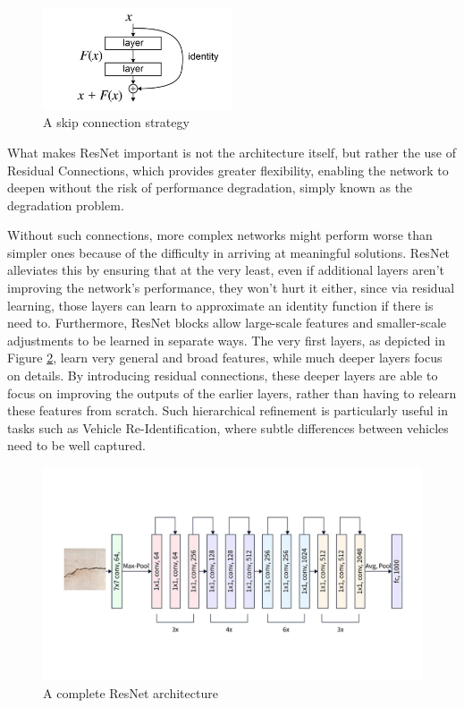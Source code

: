 \begin{figure}[ht]
    \centering
    \includegraphics[width=0.5\textwidth]{images/SkipConnection.jpg}
    \caption[A skip-connection strategy]{A skip connection strategy}
    \label{fig:SkipConnection}
\end{figure}

What makes ResNet important is not the architecture itself, but rather the use of Residual Connections, which provides greater flexibility, enabling the network to deepen without the risk of performance degradation, simply known as the degradation problem.

Without such connections, more complex networks might perform worse than simpler ones because of the difficulty in arriving at meaningful solutions. ResNet alleviates this by ensuring that at the very least, even if additional layers aren't improving the network's performance, they won't hurt it either, since via residual learning, those layers can learn to approximate an identity function if there is need to. Furthermore, ResNet blocks allow large-scale features and smaller-scale adjustments to be learned in separate ways. The very first layers, as depicted in Figure \ref{fig:ResNet}, learn very general and broad features, while much deeper layers focus on details. By introducing residual connections, these deeper layers are able to focus on improving the outputs of the earlier layers, rather than having to relearn these features from scratch. Such hierarchical refinement is particularly useful in tasks such as Vehicle Re-Identification, where subtle differences between vehicles need to be well captured.

\begin{figure}[ht]
    \centering
    \includegraphics[width=1.0\textwidth]{images/ResNet.jpg}
    \caption[ResNet architecture]{A complete ResNet architecture}
    \label{fig:ResNet}
\end{figure}

